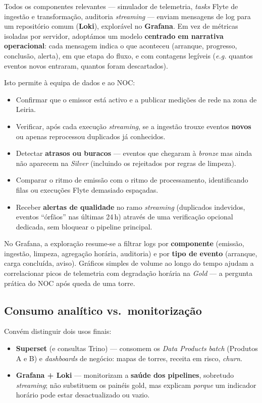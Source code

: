 \documentclass[runningheads]{llncs}
\begin{document}
Todos os componentes relevantes --- simulador de telemetria, \textit{tasks} Flyte de ingestão e transformação, auditoria \textit{streaming} --- enviam mensagens de log para um repositório comum (\textbf{Loki}), explorável no \textbf{Grafana}. Em vez de métricas isoladas por servidor, adoptámos um modelo \textbf{centrado em narrativa operacional}: cada mensagem indica o que aconteceu (arranque, progresso, conclusão, alerta), em que etapa do fluxo, e com contagens legíveis (\textit{e.g.} quantos eventos novos entraram, quantos foram descartados).

Isto permite à equipa de dados e ao NOC:

\begin{itemize}
    \item Confirmar que o emissor está activo e a publicar medições de rede na zona de Leiria.
    \item Verificar, após cada execução \textit{streaming}, se a ingestão trouxe eventos \textbf{novos} ou apenas reprocessou duplicados já conhecidos.
    \item Detectar \textbf{atrasos ou buracos} --- eventos que chegaram à \textit{bronze} mas ainda não aparecem na \textit{Silver} (incluindo os rejeitados por regras de limpeza).
    \item Comparar o ritmo de emissão com o ritmo de processamento, identificando filas ou execuções Flyte demasiado espaçadas.
    \item Receber \textbf{alertas de qualidade} no ramo \textit{streaming} (duplicados indevidos, eventos ``órfãos'' nas últimas 24\,h) através de uma verificação opcional dedicada, sem bloquear o pipeline principal.
\end{itemize}

No Grafana, a exploração resume-se a filtrar logs por \textbf{componente} (emissão, ingestão, limpeza, agregação horária, auditoria) e por \textbf{tipo de evento} (arranque, carga concluída, aviso). Gráficos simples de volume ao longo do tempo ajudam a correlacionar picos de telemetria com degradação horária na \textit{Gold} --- a pergunta prática do NOC após queda de uma torre.


\subsection{Consumo analítico vs.\ monitorização}

Convém distinguir dois usos finais:

\begin{itemize}
    \item \textbf{Superset} (e consultas Trino) --- consomem os \textit{Data Products} \textit{batch} (Produtos A e B) e \textit{dashboards} de negócio: mapas de torres, receita em risco, \textit{churn}.
    \item \textbf{Grafana + Loki} --- monitorizam a \textbf{saúde dos pipelines}, sobretudo \textit{streaming}; não substituem os painéis gold, mas explicam \emph{porque} um indicador horário pode estar desactualizado ou vazio.
\end{itemize}
\end{document}
